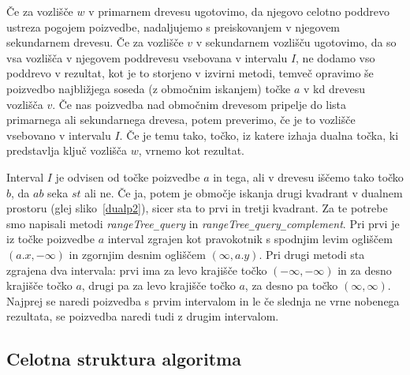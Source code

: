 \documentclass[a4paper, 12pt]{book}
\newcommand{\U}{\texttt{\_}}
\begin{document}
Če za vozlišče $w$ v primarnem drevesu ugotovimo, da njegovo celotno poddrevo ustreza pogojem poizvedbe, nadaljujemo s preiskovanjem v njegovem sekundarnem drevesu. Če za vozlišče $v$ v sekundarnem vozlišču ugotovimo, da so vsa vozlišča v njegovem poddrevesu vsebovana v intervalu $I$, ne dodamo vso poddrevo v rezultat, kot je to storjeno v izvirni metodi, temveč opravimo še poizvedbo najbližjega soseda (z območnim iskanjem) točke $a$ v kd drevesu vozlišča $v$. Če nas poizvedba nad območnim drevesom pripelje do lista primarnega ali sekundarnega drevesa, potem preverimo, če je to vozlišče vsebovano v intervalu $I$. Če je temu tako, točko, iz katere izhaja dualna točka, ki predstavlja ključ vozlišča $w$, vrnemo kot rezultat.

Interval $I$ je odvisen od točke poizvedbe $a$ in tega, ali v drevesu iščemo tako točko $b$, da $ab$ seka $st$ ali ne. Če ja, potem je območje iskanja drugi kvadrant v dualnem prostoru (glej sliko~\ref{dualp2}), sicer sta to prvi in tretji kvadrant. Za te potrebe smo napisali metodi \textit{rangeTree\U query} in \textit{rangeTree\U query\U complement}. Pri prvi je iz točke poizvedbe $a$ interval zgrajen kot pravokotnik s spodnjim levim ogliščem $(a.x, -\infty)$ in zgornjim desnim ogliščem $(\infty, a.y)$. Pri drugi metodi sta zgrajena dva intervala: prvi ima za levo krajišče točko $(-\infty, -\infty)$ in za desno krajišče točko $a$, drugi pa za levo krajišče točko $a$, za desno pa točko $(\infty, \infty)$. Najprej se naredi poizvedba s prvim intervalom in le če slednja ne vrne nobenega rezultata, se poizvedba naredi tudi z drugim intervalom.
\subsection{Celotna struktura algoritma}
\end{document}
